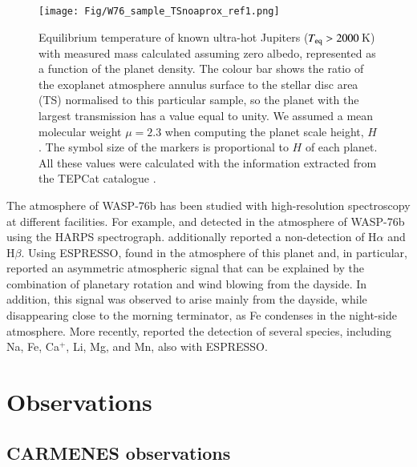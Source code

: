\documentclass{aa}
\begin{document}
\begin{figure}[]
\centering
\texttt{[image: Fig/W76\_sample\_TSnoaprox\_ref1.png]}
\caption{Equilibrium temperature of known ultra-hot Jupiters ($T_{\rm eq}>2000$\,K) with measured mass calculated assuming zero albedo, represented as a function of the planet density. The colour bar shows the ratio of the exoplanet atmosphere annulus surface to the stellar disc area (TS) normalised to this particular sample, so the planet with the largest transmission has a value equal to unity. We assumed a mean molecular weight $\mu=2.3$ when computing the planet scale height, $H$. The symbol size of the markers is proportional to $H$ of each planet. All these values were calculated with the information extracted from the TEPCat catalogue \citep{TEPCat}.}
\label{fig:UHJ_context}
\end{figure}

The atmosphere of WASP-76b has been studied with high-resolution spectroscopy at different facilities. For example, \citet{Seidel2019} and \citet{Zak2019} detected  in the atmosphere of WASP-76b using the HARPS spectrograph. \citet{Zak2019} additionally reported a non-detection of H$\alpha$ and H$\beta$. Using ESPRESSO, \citet{Ehrenreich2020} found  in the atmosphere of this planet and, in particular, reported an asymmetric atmospheric signal that can be explained by the combination of planetary
rotation and wind blowing from the dayside. In addition, this  signal was observed to arise mainly from the dayside, while disappearing close to the morning terminator, as Fe condenses in the night-side atmosphere. More recently, \citet{Tabernero2020} reported the detection of several species, including Na, Fe, Ca$^{+}$, Li, Mg, and Mn, also with ESPRESSO.


\section{Observations} \label{sec:observations}

\subsection{CARMENES observations} \label{sec:obs_carm}
\end{document}
